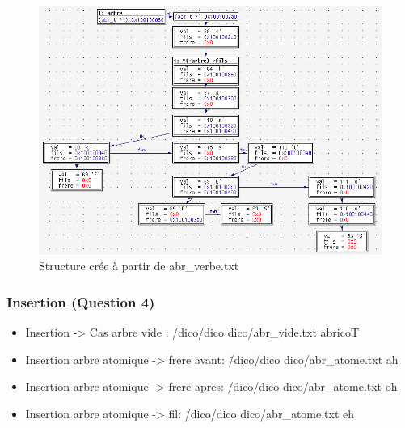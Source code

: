 \documentclass{report}
\begin{document}
\begin{itemize}
\begin{figure}[p]
    \caption{\label{abr_verbe} Structure crée à partir de abr\_verbe.txt}
   \includegraphics[scale=0.60]{./abr_verbe.png}
\end{figure}

\end{itemize}

\newpage
\subsubsection{Insertion (Question 4)}
\begin{itemize}

    \item Insertion -> Cas arbre vide : \./dico/dico dico/abr\_vide.txt abricoT
\vspace{0.5cm}

\vspace{0.5cm}

    \item Insertion arbre atomique -> frere avant: \./dico/dico dico/abr\_atome.txt ah
\vspace{0.5cm}

\vspace{0.5cm}

    \item Insertion arbre atomique -> frere apres: \./dico/dico dico/abr\_atome.txt oh
\vspace{0.5cm}

\vspace{0.5cm}

    \item Insertion arbre atomique -> fil: \./dico/dico dico/abr\_atome.txt eh
\vspace{0.5cm}

\vspace{0.5cm}
\end{itemize}
\end{document}
